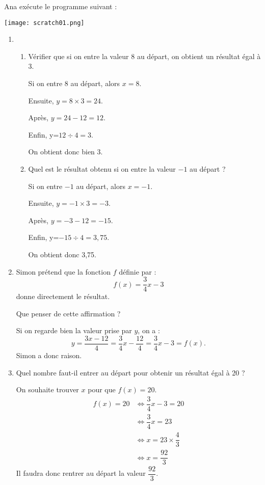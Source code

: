 \documentclass[12pt,a4paper]{article}
\begin{document}
Ana exécute le programme suivant :

\begin{center}
\texttt{[image: scratch01.png]}
\end{center}

\begin{enumerate}
	\item
	\begin{enumerate}
		\item  Vérifier que si on entre la valeur 8 au départ, on obtient un résultat égal à 3.
		\begin{correction}
		Si on entre 8 au départ, alors $x=8$.
		
		Ensuite, $y=8\times3=24$.
		
		Après, $y=24-12=12$.
		
		Enfin, y=$12 \div 4=3$.
		
		\medskip
		
		On obtient donc bien 3.
		\end{correction}
		\item Quel est le résultat obtenu si on entre la valeur $-1$ au départ ?
		\begin{correction}
		Si on entre $-1$ au départ, alors $x=-1$.
		
		Ensuite, $y=-1\times3=-3$.
		
		Après, $y=-3-12=-15$.
		
		Enfin, y=$-15 \div 4=3,75$.
		
		\medskip
		
		On obtient donc 3,75.
		\end{correction}
	\end{enumerate}
	\newpageforcorrection
	\item Simon prétend que la fonction $f$ définie par :
\[
f(x)=\frac34x-3
\]
donne directement le résultat.

Que penser de cette affirmation ?
\begin{correction}
Si on regarde bien la valeur prise par $y$, on a :
\[
y=\dfrac{3x-12}{4}=\dfrac{3}{4}x-\dfrac{12}{4}=\dfrac{3}{4}x-3=f(x).
\]
Simon a donc raison.
\end{correction}
	\item Quel nombre faut-il entrer au départ pour obtenir un résultat égal à 20 ?
	\begin{correction}
	On souhaite trouver $x$ pour que $f(x)=20$.
	\begin{align*}
	f(x)=20 & \iff \dfrac{3}{4}x-3=20\\
	&\iff \dfrac{3}{4}x=23\\
	&\iff x=23\times\dfrac{4}{3}\\
	&\iff x=\dfrac{92}{3}
	\end{align*}
	Il faudra donc rentrer au départ la valeur $\dfrac{92}{3}$.
	\end{correction}
\end{enumerate}
\end{document}
